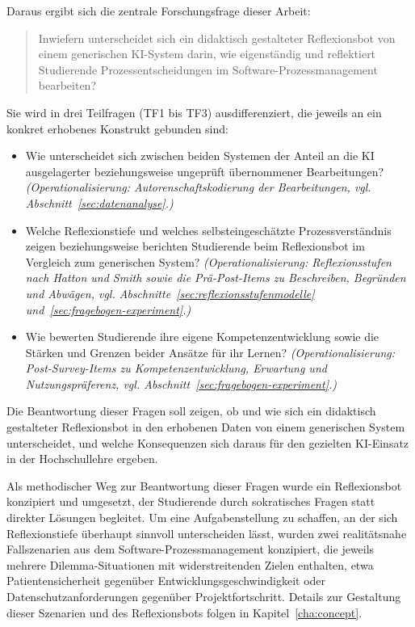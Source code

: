 Daraus ergibt sich die zentrale Forschungsfrage dieser Arbeit:

\begin{quote}
Inwiefern unterscheidet sich ein didaktisch gestalteter Reflexionsbot von einem generischen
KI-System darin, wie eigenständig und reflektiert Studierende Prozessentscheidungen im
Software-Prozessmanagement bearbeiten?
\end{quote}

Sie wird in drei Teilfragen (TF1 bis TF3) ausdifferenziert, die jeweils an ein konkret erhobenes
Konstrukt gebunden sind:

\begin{itemize}
    \item[\textbf{TF1}] Wie unterscheidet sich zwischen beiden Systemen der Anteil an die KI
    ausgelagerter beziehungsweise ungeprüft übernommener Bearbeitungen? \emph{(Operationalisierung:
    Autorenschaftskodierung der Bearbeitungen, vgl. Abschnitt~\ref{sec:datenanalyse}.)}
    \item[\textbf{TF2}] Welche Reflexionstiefe und welches selbsteingeschätzte Prozessverständnis
    zeigen beziehungsweise berichten Studierende beim Reflexionsbot im Vergleich zum generischen
    System? \emph{(Operationalisierung: Reflexionsstufen nach Hatton und Smith sowie die
    Prä-Post-Items zu Beschreiben, Begründen und Abwägen, vgl.
    Abschnitte~\ref{sec:reflexionsstufenmodelle} und~\ref{sec:fragebogen-experiment}.)}
    \item[\textbf{TF3}] Wie bewerten Studierende ihre eigene Kompetenzentwicklung sowie die Stärken
    und Grenzen beider Ansätze für ihr Lernen? \emph{(Operationalisierung: Post-Survey-Items zu
    Kompetenzentwicklung, Erwartung und Nutzungspräferenz, vgl.
    Abschnitt~\ref{sec:fragebogen-experiment}.)}
\end{itemize}

Die Beantwortung dieser Fragen soll zeigen, ob und wie sich ein didaktisch gestalteter
Reflexionsbot in den erhobenen Daten von einem generischen System unterscheidet, und welche
Konsequenzen sich daraus für den gezielten KI-Einsatz in der Hochschullehre ergeben.

Als methodischer Weg zur Beantwortung dieser Fragen wurde ein Reflexionsbot konzipiert und
umgesetzt, der Studierende durch sokratisches Fragen statt direkter Lösungen begleitet. Um eine
Aufgabenstellung zu schaffen, an der sich Reflexionstiefe überhaupt sinnvoll unterscheiden lässt,
wurden zwei realitätsnahe Fallszenarien aus dem Software-Prozessmanagement konzipiert, die jeweils
mehrere Dilemma-Situationen mit widerstreitenden Zielen enthalten, etwa Patientensicherheit
gegenüber Entwicklungsgeschwindigkeit oder Datenschutzanforderungen gegenüber Projektfortschritt.
Details zur Gestaltung dieser Szenarien und des Reflexionsbots folgen in Kapitel~\ref{cha:concept}.

